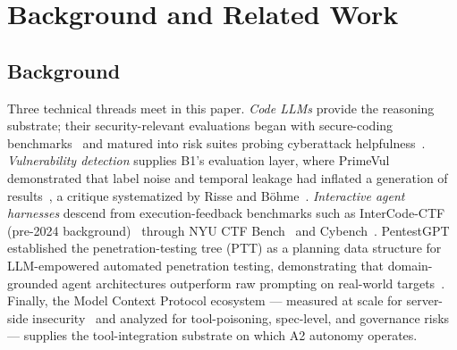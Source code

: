 \documentclass[conference,compsoc]{IEEEtran}
\begin{document}
\section{Background and Related Work}
\label{sec:related}

\subsection{Background}
Three technical threads meet in this paper. \emph{Code LLMs} provide the reasoning substrate;
their security-relevant evaluations began with secure-coding benchmarks~\cite{csev12023bg} and
matured into risk suites probing cyberattack helpfulness~\cite{csev22024,csev32024}.
\emph{Vulnerability detection} supplies B1's evaluation layer, where PrimeVul demonstrated that
label noise and temporal leakage had inflated a generation of results~\cite{primevul2024},
a critique systematized by Risse and B\"ohme~\cite{rissebohme-wrongexam2024}. \emph{Interactive
agent harnesses} descend from execution-feedback benchmarks such as InterCode-CTF
(pre-2024 background)~\cite{intercode2023} through NYU CTF Bench~\cite{nyuctfbench2024} and
Cybench~\cite{cybench2024}. PentestGPT established the penetration-testing tree (PTT) as a
planning data structure for LLM-empowered automated penetration testing, demonstrating that
domain-grounded agent architectures outperform raw prompting on real-world
targets~\cite{pentestgpt2024}. Finally, the Model Context Protocol ecosystem --- measured at
scale for server-side insecurity~\cite{mcpfirstlook2025} and analyzed for tool-poisoning,
spec-level, and governance risks~\cite{mcppoisoning2026,mcpspec2026,mcpgovernance2025} ---
supplies the tool-integration substrate on which A2 autonomy operates.
\end{document}
